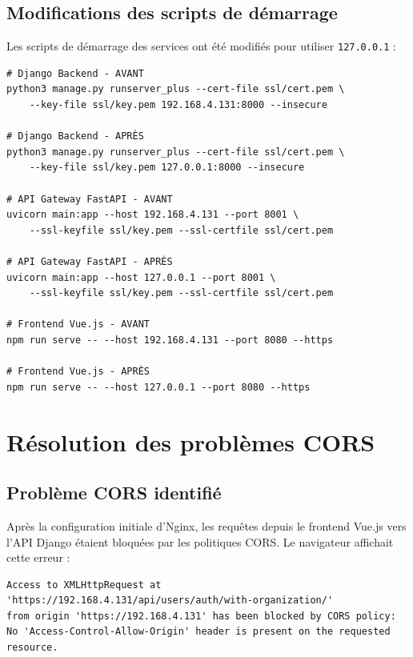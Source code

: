 \documentclass[12pt,a4paper]{article}
\begin{document}
\subsection{Modifications des scripts de démarrage}

Les scripts de démarrage des services ont été modifiés pour utiliser \texttt{127.0.0.1} :

\begin{lstlisting}[style=bash, caption={Modifications des scripts de démarrage}]
# Django Backend - AVANT
python3 manage.py runserver_plus --cert-file ssl/cert.pem \
    --key-file ssl/key.pem 192.168.4.131:8000 --insecure

# Django Backend - APRÈS  
python3 manage.py runserver_plus --cert-file ssl/cert.pem \
    --key-file ssl/key.pem 127.0.0.1:8000 --insecure

# API Gateway FastAPI - AVANT
uvicorn main:app --host 192.168.4.131 --port 8001 \
    --ssl-keyfile ssl/key.pem --ssl-certfile ssl/cert.pem

# API Gateway FastAPI - APRÈS
uvicorn main:app --host 127.0.0.1 --port 8001 \
    --ssl-keyfile ssl/key.pem --ssl-certfile ssl/cert.pem

# Frontend Vue.js - AVANT
npm run serve -- --host 192.168.4.131 --port 8080 --https

# Frontend Vue.js - APRÈS
npm run serve -- --host 127.0.0.1 --port 8080 --https
\end{lstlisting}


\section{Résolution des problèmes CORS}

\subsection{Problème CORS identifié}

Après la configuration initiale d'Nginx, les requêtes depuis le frontend Vue.js vers l'API Django étaient bloquées par les politiques CORS. Le navigateur affichait cette erreur :

\begin{lstlisting}[style=bash, caption={Erreur CORS dans la console du navigateur}]
Access to XMLHttpRequest at 'https://192.168.4.131/api/users/auth/with-organization/' 
from origin 'https://192.168.4.131' has been blocked by CORS policy: 
No 'Access-Control-Allow-Origin' header is present on the requested resource.
\end{lstlisting}
\end{document}
